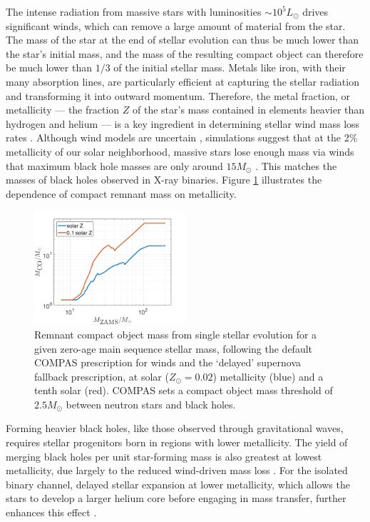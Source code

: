 \documentclass[iop,onecolumn]{revtex4-1}
\begin{document}
The intense radiation from massive stars with luminosities $\sim 10^5 L_\odot$ drives significant winds, which can remove a large amount of material from the star. The mass of the star at the end of stellar evolution can thus be much lower than the star's initial mass, and the mass of the resulting compact object can therefore be much lower than $1/3$ of the initial stellar mass. Metals like iron, with their many absorption lines, are particularly efficient at capturing the stellar radiation and transforming it into outward momentum.  Therefore, the metal fraction, or metallicity  --- the fraction $Z$ of the star's mass contained in elements heavier than hydrogen and helium --- is a key ingredient in determining stellar wind mass loss rates \citep{Vink:2001}. Although wind models are uncertain \citep[e.g.,][]{Renzo:2017}, simulations suggest that at the 2\% metallicity of our solar neighborhood, massive stars lose enough mass via winds that maximum black hole masses are only around $15 M_\odot$ \citep{Belczynski:2009,Spera:2015}. This matches the masses of black holes observed in X-ray binaries. Figure \ref{fig:BHremnant} illustrates the dependence of compact remnant mass on metallicity. 
 
\begin{figure}
	\centering
	\includegraphics[width=0.5\textwidth]{BHremnantdelayed.png}
	\caption{\label{fig:BHremnant} Remnant compact object mass from single stellar evolution for a given zero-age main sequence stellar mass, following the default COMPAS prescription for winds \citep{Stevenson:2017}  and the `delayed' \citet{Fryer:2012} supernova fallback prescription, at solar ($Z_\odot=0.02$) metallicity (blue) and a tenth solar (red).  COMPAS sets a compact object mass threshold of $2.5 M_\odot$ between neutron stars and black holes.
	} 
\end{figure}

Forming heavier black holes, like those observed through gravitational waves, requires stellar progenitors born in regions with lower metallicity. The yield of merging black holes per unit star-forming mass is also greatest at lowest metallicity, due largely to the reduced wind-driven mass loss \citep[e.g.,][]{Belczynski:2010,Kruckow:2018}. For the isolated binary channel, delayed stellar expansion at lower metallicity, which allows the stars to develop a larger helium core before engaging in mass transfer, further enhances this effect \citep[e.g.,][]{Stevenson:2017}.
\end{document}
